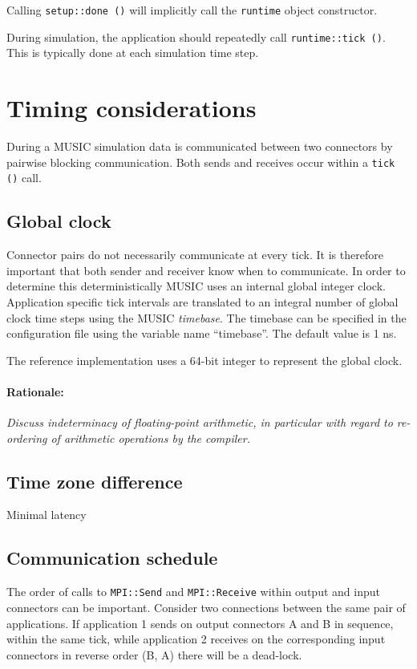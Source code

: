 \documentclass[a4paper]{report}
\newenvironment{rationale}%
{\par\paragraph{Rationale:}}%
{\par}
\begin{document}
Calling \verb|setup::done ()| will implicitly call the \verb|runtime|
object constructor.

During simulation, the application should repeatedly call
\verb|runtime::tick ()|.  This is typically done at each simulation
time step.

\section{Timing considerations}

During a MUSIC simulation data is communicated between two connectors
by pairwise blocking communication.  Both sends and receives occur
within a \verb|tick ()| call.

\subsection{Global clock}

Connector pairs do not necessarily communicate at every tick.  It is
therefore important that both sender and receiver know when to
communicate.  In order to determine this deterministically MUSIC uses
an internal global integer clock.  Application specific tick intervals
are translated to an integral number of global clock time steps using
the MUSIC \emph{timebase}.  The timebase can be specified in the
configuration file using the variable name ``timebase''.  The default
value is 1 ns.

The reference implementation uses a 64-bit integer to represent the
global clock.

\begin{rationale}
  \emph{Discuss indeterminacy of floating-point arithmetic, in particular
    with regard to re-ordering of arithmetic operations by the compiler.}
\end{rationale}

\subsection{Time zone difference}

Minimal latency

\subsection{Communication schedule}

The order of calls to \verb|MPI::Send| and \verb|MPI::Receive| within
output and input connectors can be important.  Consider two
connections between the same pair of applications.  If application 1
sends on output connectors A and B in sequence, within the same tick,
while application 2 receives on the corresponding input connectors in
reverse order (B, A) there will be a dead-lock.
\end{document}
